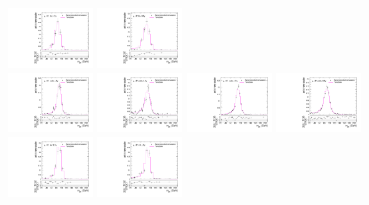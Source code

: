 \begin{figure}[htpb]
  \includegraphics[width=0.2\textwidth]{fig/analysisAppendix/templateVsReco_VBFWprToWZ2000_r0_MJ_mu_HP_bb_HDy.pdf}
  \includegraphics[width=0.2\textwidth]{fig/analysisAppendix/templateVsReco_VBFWprToWZ2000_r0_MJ_mu_LP_bb_HDy.pdf}\\
  \includegraphics[width=0.2\textwidth]{fig/analysisAppendix/templateVsReco_VBFWprToWZ2000_r0_MJ_mu_HP_nobb_LDy.pdf}
  \includegraphics[width=0.2\textwidth]{fig/analysisAppendix/templateVsReco_VBFWprToWZ2000_r0_MJ_mu_LP_nobb_LDy.pdf}
  \includegraphics[width=0.2\textwidth]{fig/analysisAppendix/templateVsReco_VBFWprToWZ2000_r0_MJ_mu_HP_nobb_HDy.pdf}
  \includegraphics[width=0.2\textwidth]{fig/analysisAppendix/templateVsReco_VBFWprToWZ2000_r0_MJ_mu_LP_nobb_HDy.pdf}\\
  \includegraphics[width=0.2\textwidth]{fig/analysisAppendix/templateVsReco_VBFWprToWZ2000_r0_MJ_mu_HP_vbf_LDy.pdf}
  \includegraphics[width=0.2\textwidth]{fig/analysisAppendix/templateVsReco_VBFWprToWZ2000_r0_MJ_mu_LP_vbf_LDy.pdf}

\end{figure}

